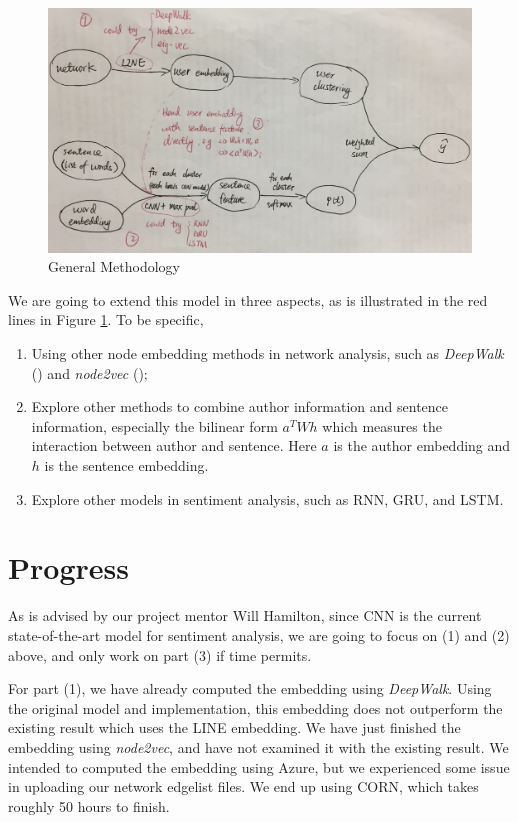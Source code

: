 \documentclass{article} %
\begin{document}
\begin{figure}[htbp] %
   \centering
   \includegraphics[width=5.2in]{flow.jpg} 
   \caption{General Methodology}
   \label{Fig:Flow}
\end{figure}



We are going to extend this model in three aspects, as is illustrated in the red lines in Figure \ref{Fig:Flow}. To be specific, 
\begin{enumerate}   [(1)]
\item Using other node embedding methods in network analysis, such as \textit{DeepWalk} (\cite{perozzi2014deepwalk}) and \textit{node2vec} (\cite{grover2016node2vec});
\item Explore other methods to combine author information and sentence information, especially the bilinear form $a^T W h$ which measures the interaction between author and sentence. Here $a$ is the author embedding and $h$ is the sentence embedding.
\item Explore other models in sentiment analysis, such as RNN, GRU, and LSTM.
\end{enumerate}

\section{Progress}
As is advised by our project mentor Will Hamilton, since CNN is the current state-of-the-art model for sentiment analysis, we are going to focus on (1) and (2) above, and only work on part (3) if time permits. 

For part (1), we have already computed the embedding using \textit{DeepWalk}. Using the original model and implementation, this embedding does not outperform the existing result which uses the LINE embedding. We have just finished the embedding using \textit{node2vec}, and have not examined it with the existing result.
We intended to computed the embedding using Azure, but we experienced some issue in uploading our network edgelist files. We end up using CORN, which takes roughly 50 hours to finish.
\end{document}
